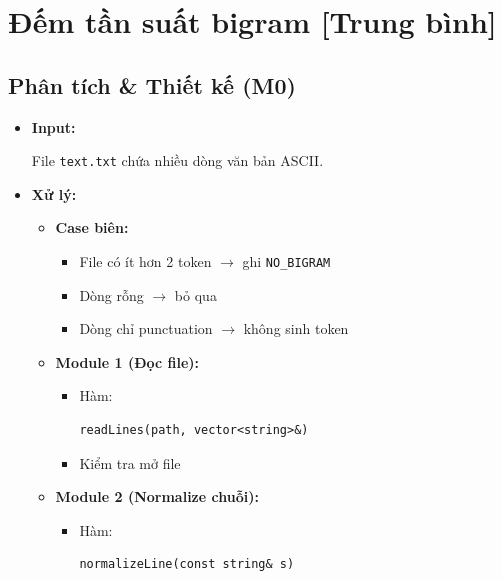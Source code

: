 \section{Đếm tần suất bigram [Trung bình]}
\subsection{Phân tích \& Thiết kế (M0)}

\begin{itemize}

    \item \textbf{Input:}

    File \texttt{text.txt} chứa nhiều dòng văn bản ASCII.

    \item \textbf{Xử lý:}

    \begin{itemize}

        \item \textbf{Case biên:}

        \begin{itemize}
            \item File có ít hơn 2 token
            $\rightarrow$
            ghi \texttt{NO\_BIGRAM}
            \item Dòng rỗng $\rightarrow$ bỏ qua
            \item Dòng chỉ punctuation
            $\rightarrow$
            không sinh token
        \end{itemize}

        \item \textbf{Module 1 (Đọc file):}

        \begin{itemize}
            \item Hàm:
\begin{lstlisting}
readLines(path, vector<string>&)
\end{lstlisting}

            \item Kiểm tra mở file
        \end{itemize}

        \item \textbf{Module 2 (Normalize chuỗi):}

        \begin{itemize}
            \item Hàm:
\begin{lstlisting}
normalizeLine(const string& s)
\end{lstlisting}


\end{itemize}
\end{itemize}
\end{itemize}
